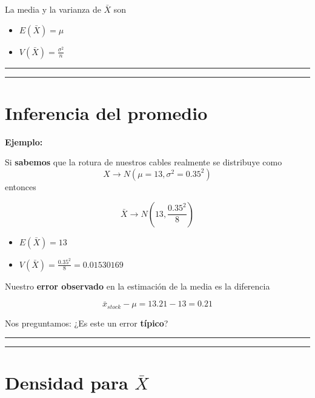 \documentclass[
]{book}
\providecommand{\tightlist}{%
  \setlength{\itemsep}{0pt}\setlength{\parskip}{0pt}}
\begin{document}
La media y la varianza de \(\bar{X}\) son

\begin{itemize}
\tightlist
\item
  \(E(\bar{X})=\mu\)
\item
  \(V(\bar{X})=\frac{\sigma^2}{n}\)
\end{itemize}

\begin{center}\rule{0.5\linewidth}{0.5pt}\end{center}

\begin{center}\rule{0.5\linewidth}{0.5pt}\end{center}

\hypertarget{inferencia-del-promedio}{%
\section{Inferencia del promedio}\label{inferencia-del-promedio}}

\textbf{Ejemplo:}

Si \textbf{sabemos} que la rotura de nuestros cables realmente se distribuye como \[X \rightarrow N(\mu=13, \sigma^2=0.35^2)\] entonces

\[\bar{X} \rightarrow N(13, \frac{0.35^2}{8})\]

\begin{itemize}
\tightlist
\item
  \(E(\bar{X})=13\)
\item
  \(V(\bar{X})=\frac{0.35^2}{8}=0.01530169\)
\end{itemize}

Nuestro \textbf{error observado} en la estimación de la media es la diferencia

\[\bar{x}_{stock}-\mu=13.21-13=0.21\]

Nos preguntamos: ¿Es este un error \textbf{típico}?

\begin{center}\rule{0.5\linewidth}{0.5pt}\end{center}

\begin{center}\rule{0.5\linewidth}{0.5pt}\end{center}

\hypertarget{densidad-para-barx}{%
\section{\texorpdfstring{Densidad para \(\bar{X}\)}{Densidad para \textbackslash bar\{X\}}}\label{densidad-para-barx}}
\end{document}
